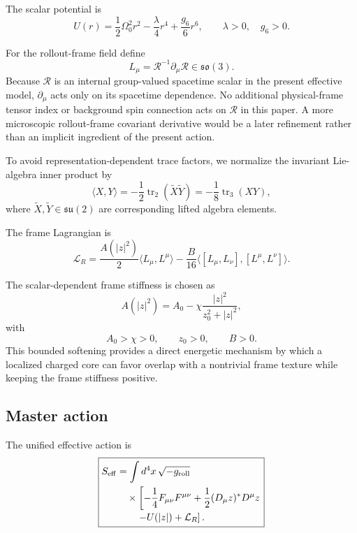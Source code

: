 \documentclass[11pt]{article}
\begin{document}
The scalar potential is
\begin{equation}
U(r)
=
\frac12\Omega_0^2r^2
-
\frac{\lambda}{4}r^4
+
\frac{g_6}{6}r^6,
\qquad
\lambda>0,\quad g_6>0.
\end{equation}

For the rollout-frame field define
\begin{equation}
\boxed{
L_\mu
=
\mathcal R^{-1}\partial_\mu\mathcal R
\in\mathfrak{so}(3).
}
\end{equation}
Because \(\mathcal R\) is an internal group-valued spacetime scalar in the present effective model, \(\partial_\mu\) acts only on its spacetime dependence. No additional physical-frame tensor index or background spin connection acts on \(\mathcal R\) in this paper. A more microscopic rollout-frame covariant derivative would be a later refinement rather than an implicit ingredient of the present action.

To avoid representation-dependent trace factors, we normalize the invariant Lie-algebra inner product by
\begin{equation}
\boxed{
\langle X,Y\rangle
=
-\frac12\operatorname{tr}_{2}
(\widetilde X\widetilde Y)
=
-\frac18\operatorname{tr}_{3}(XY),
}
\end{equation}
where \(\widetilde X,\widetilde Y\in\mathfrak{su}(2)\) are corresponding lifted algebra elements.

The frame Lagrangian is
\begin{equation}
\boxed{
\mathcal L_R
=
\frac{A(|z|^2)}{2}
\langle L_\mu,L^\mu\rangle
-
\frac{B}{16}
\langle
[L_\mu,L_\nu],
[L^\mu,L^\nu]
\rangle.
}
\end{equation}

The scalar-dependent frame stiffness is chosen as
\begin{equation}
\boxed{
A(|z|^2)
=
A_0
-
\chi
\frac{|z|^2}{z_0^2+|z|^2},
}
\end{equation}
with
\begin{equation}
A_0>\chi>0,
\qquad
z_0>0,
\qquad
B>0.
\end{equation}
This bounded softening provides a direct energetic mechanism by which a localized charged core can favor overlap with a nontrivial frame texture while keeping the frame stiffness positive.

\subsection{Master action}

The unified effective action is
\begin{equation}
\boxed{
\begin{aligned}
S_{\rm eff}
&=
\int d^4x\,\sqrt{-g_{\rm roll}}\\
&\quad\times
\left[
-\frac14F_{\mu\nu}F^{\mu\nu}
+\frac12(D_\mu z)^\ast D^\mu z
\right.\\[-0.2em]
&\qquad\left.
-U(|z|)+\mathcal L_R
\right].
\end{aligned}
}
\end{equation}
\end{document}
